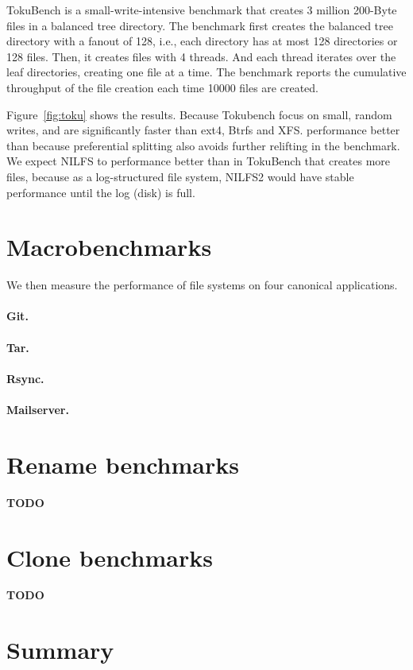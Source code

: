 TokuBench is a small-write-intensive benchmark that creates 3 million
200-Byte files in a balanced tree directory.
The benchmark first creates the balanced tree directory with a fanout of 128,
i.e., each directory has at most 128 directories or 128 files.
Then, it creates files with 4 threads.
And each thread iterates over the leaf directories, creating one file at a time.
The benchmark reports the cumulative throughput of the file creation each time
10000 files are created.

Figure~\ref{fig:toku} shows the results.
Because Tokubench focus on small, random writes, \betrfsFour and \betrfsFive are
significantly faster than ext4, Btrfs and XFS.
\betrfsFive performance better than \betrfsFour because preferential splitting
also avoids further relifting in the benchmark.
We expect NILFS to performance better than \betrfsFive in TokuBench that creates
more files,
because as a log-structured file system, NILFS2 would have stable performance
until the log (disk) is full.

\section{Macrobenchmarks}

We then measure the performance of file systems on four canonical applications.

\paragraph{Git.}

\paragraph{Tar.}

\paragraph{Rsync.}

\paragraph{Mailserver.}

\section{Rename benchmarks}

\textbf{TODO}

\section{Clone benchmarks}

\textbf{TODO}

\section{Summary}
